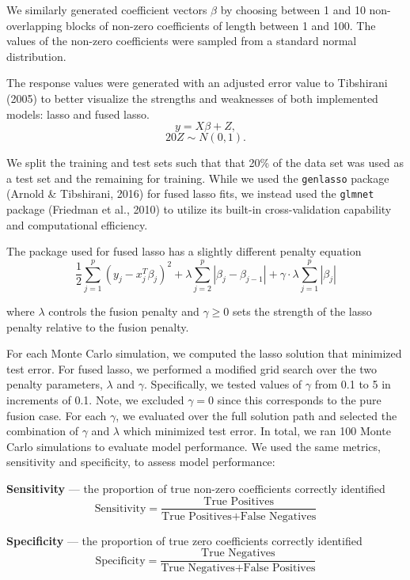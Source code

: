 \documentclass[12pt]{article}
\begin{document}
We similarly generated coefficient vectors $\beta$ by choosing between 1 and 10 non-overlapping blocks of non-zero coefficients of length between 1 and 100. The values of the non-zero coefficients were sampled from a standard normal distribution. 

The response values were generated with an adjusted error value to Tibshirani (2005) to better visualize the strengths and weaknesses of both implemented models: lasso and fused lasso.
\[y = X\beta + Z,\]
\[20Z \sim N(0, 1).\]

We split the training and test sets such that that 20\% of the data set was used as a test set and the remaining for training. While we used the \texttt{genlasso} package (Arnold \& Tibshirani, 2016) for fused lasso fits, we instead used the \texttt{glmnet} package (Friedman et al., 2010) to utilize its built-in cross-validation capability and computational efficiency.

The package used for fused lasso has a slightly different penalty equation
\[\frac12 \sum_{j = 1}^{p} (y_j - x_j^T \beta_j)^2 + \lambda \sum_{j = 2}^{p} \left|\beta_j - \beta_{j - 1}\right| + \gamma \cdot \lambda \sum_{j=1}^{p} \left|\beta_j\right|\]

\noindent where $\lambda$ controls the fusion penalty and $\gamma \ge 0$ sets the strength of the lasso penalty relative to the fusion penalty.

For each Monte Carlo simulation, we computed the lasso solution that minimized test error. For fused lasso, we performed a modified grid search over the two penalty parameters, $\lambda$ and $\gamma$. Specifically, we tested values of $\gamma$ from 0.1 to 5 in increments of 0.1. Note, we excluded $\gamma = 0$ since this corresponds to the pure fusion case. For each $\gamma$, we evaluated over the full solution path and selected the combination of $\gamma$ and $\lambda$ which minimized test error. In total, we ran 100 Monte Carlo simulations to evaluate model performance. We used the same metrics, sensitivity and specificity, to assess model performance:

\vspace{0.5cm}

\textbf{Sensitivity} — the proportion of true non-zero coefficients correctly identified
\[\text{Sensitivity} = \frac{\text{True Positives}}{\text{True Positives} + \text{False Negatives}}\]

\textbf{Specificity} — the proportion of true zero coefficients correctly identified
\[\text{Specificity} = \frac{\text{True Negatives}}{\text{True Negatives} + \text{False Positives}}\]
\end{document}
